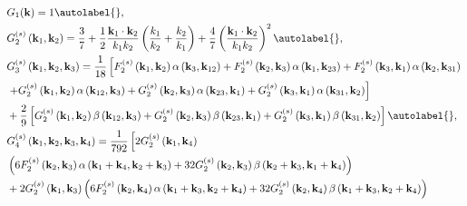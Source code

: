 \begin{align*}
    & G_{1}(\mathbf{k})=1  \autolabel{},\\
    & G_{2}^{(s)}\left(\mathbf{k}_{1}, \mathbf{k}_{2}\right)=\frac{3}{7}+\frac{1}{2} \frac{\mathbf{k}_{1} \cdot \mathbf{k}_{2}}{k_{1} k_{2}}\left(\frac{k_{1}}{k_{2}}+\frac{k_{2}}{k_{1}}\right)+\frac{4}{7}\left(\frac{\mathbf{k}_{1} \cdot \mathbf{k}_{2}}{k_{1} k_{2}}\right)^{2}  \autolabel{},\\
    & G_{3}^{(s)}\left(\mathbf{k}_{1}, \mathbf{k}_{2}, \mathbf{k}_{3}\right)=\frac{1}{18}\left[F_{2}^{(s)}\left(\mathbf{k}_{1}, \mathbf{k}_{2}\right) \alpha\left(\mathbf{k}_{3}, \mathbf{k}_{12}\right)+F_{2}^{(s)}\left(\mathbf{k}_{2}, \mathbf{k}_{3}\right) \alpha\left(\mathbf{k}_{1}, \mathbf{k}_{23}\right)+F_{2}^{(s)}\left(\mathbf{k}_{3}, \mathbf{k}_{1}\right) \alpha\left(\mathbf{k}_{2}, \mathbf{k}_{31}\right)\right. \\
    & \left.+G_{2}^{(s)}\left(\mathbf{k}_{1}, \mathbf{k}_{2}\right) \alpha\left(\mathbf{k}_{12}, \mathbf{k}_{3}\right)+G_{2}^{(s)}\left(\mathbf{k}_{2}, \mathbf{k}_{3}\right) \alpha\left(\mathbf{k}_{23}, \mathbf{k}_{1}\right)+G_{2}^{(s)}\left(\mathbf{k}_{3}, \mathbf{k}_{1}\right) \alpha\left(\mathbf{k}_{31}, \mathbf{k}_{2}\right)\right] \\
    & +\frac{2}{9}\left[G_{2}^{(s)}\left(\mathbf{k}_{1}, \mathbf{k}_{2}\right) \beta\left(\mathbf{k}_{12}, \mathbf{k}_{3}\right)+G_{2}^{(s)}\left(\mathbf{k}_{2}, \mathbf{k}_{3}\right) \beta\left(\mathbf{k}_{23}, \mathbf{k}_{1}\right)+G_{2}^{(s)}\left(\mathbf{k}_{3}, \mathbf{k}_{1}\right) \beta\left(\mathbf{k}_{31}, \mathbf{k}_{2}\right)\right]  \autolabel{},\\
    & G_{4}^{(s)}\left(\mathbf{k}_{1}, \mathbf{k}_{2}, \mathbf{k}_{3}, \mathbf{k}_{4}\right)=\frac{1}{792}\left[2 G_{2}^{(s)}\left(\mathbf{k}_{1}, \mathbf{k}_{4}\right)\right. \\
    & \left(6 F_{2}^{(s)}\left(\mathbf{k}_{2}, \mathbf{k}_{3}\right) \alpha\left(\mathbf{k}_{1}+\mathbf{k}_{4}, \mathbf{k}_{2}+\mathbf{k}_{3}\right)+32 G_{2}^{(s)}\left(\mathbf{k}_{2}, \mathbf{k}_{3}\right) \beta\left(\mathbf{k}_{2}+\mathbf{k}_{3}, \mathbf{k}_{1}+\mathbf{k}_{4}\right)\right) \\
    & +2 G_{2}^{(s)}\left(\mathbf{k}_{1}, \mathbf{k}_{3}\right)\left(6 F_{2}^{(s)}\left(\mathbf{k}_{2}, \mathbf{k}_{4}\right) \alpha\left(\mathbf{k}_{1}+\mathbf{k}_{3}, \mathbf{k}_{2}+\mathbf{k}_{4}\right)+32 G_{2}^{(s)}\left(\mathbf{k}_{2}, \mathbf{k}_{4}\right) \beta\left(\mathbf{k}_{1}+\mathbf{k}_{3}, \mathbf{k}_{2}+\mathbf{k}_{4}\right)\right) \\

\end{align*}
